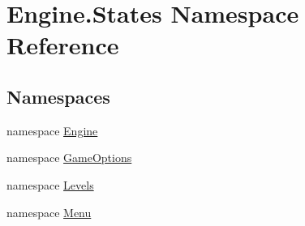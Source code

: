 \hypertarget{a00277}{}\section{Engine.\+States Namespace Reference}
\label{a00277}
\subsection*{Namespaces}
\begin{DoxyCompactItemize}
\item 
namespace \hyperlink{a00276}{Engine}
\item 
namespace \hyperlink{a00278}{Game\+Options}
\item 
namespace \hyperlink{a00279}{Levels}
\item 
namespace \hyperlink{a00280}{Menu}
\end{DoxyCompactItemize}
